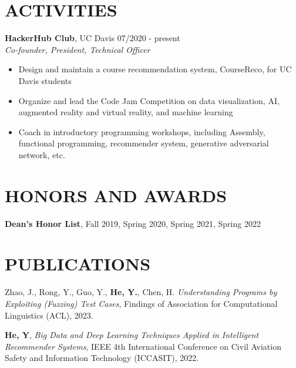\documentclass[margin,line]{res}
\begin{document}
\begin{resume}
\section{\sc ACTIVITIES}
\textbf{HackerHub Club}, UC Davis \hfill {07/2020 - present} \\
\textit{Co-founder, President, Technical Officer}
\begin{itemize}
	\item Design and maintain a course recommendation system, CourseReco, for UC Davis students 
	\item Organize and lead the Code Jam Competition on data visualization, AI, augmented reality and virtual reality, and machine learning 
	\item Coach in introductory programming workshops, including Assembly, functional programming, recommender system, generative adversarial network, etc. 
\end{itemize}

\section{\sc HONORS AND AWARDS} 
\textbf{Dean's Honor List}, Fall 2019, Spring 2020, Spring 2021, Spring 2022
\vspace{0.5cm}

\section{\sc PUBLICATIONS}
Zhao, J., Rong, Y., Guo, Y., \textbf{He, Y.}, Chen, H. \textit{Understanding Programs by Exploiting (Fuzzing) Test Cases},
Findings of Association for Computational Linguistics (ACL), 2023.

\textbf{He, Y}, \textit{Big Data and Deep Learning Techniques Applied in Intelligent Recommender Systems}, 
IEEE 4th International Conference on Civil Aviation Safety and Information Technology (ICCASIT), 2022.



\end{resume}
\end{document}
